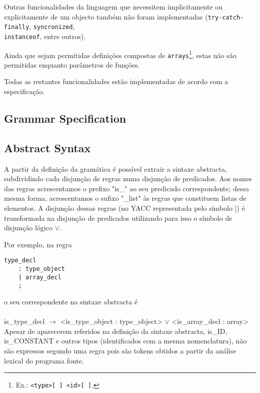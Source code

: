 \documentclass[a4paper]{article}
\begin{document}
Outras funcionalidades da linguagem que necessitem implicitamente ou explicitamente de um objecto também não foram implementadas (\texttt{try-catch-finally}, \texttt{syncronized}, \\ \texttt{instanceof}, entre outros).

Ainda que sejam permitidas definições compostas de \texttt{arrays}\footnote[1]{Ex.: \texttt{<type>[ ] <id>[ ]}.}, estas não são permitidas enquanto parâmetros de funções.

Todas as restantes funcionalidades estão implementadas de acordo com a especificação.

\cleardoublepage

\subsection{Grammar Specification}


\cleardoublepage

\subsection{Abstract Syntax}
\indent \indent A partir da definição da gramática é possível extrair a sintaxe abstracta, subdividindo cada disjunção de regras numa disjunção de predicados.
Aos nomes das regras acrescentamos o prefixo "is\_" ao seu predicado correspondente;
dessa mesma forma, acrescentamos o sufixo "\_list" às regras que constituem listas de elementos.
A disjunção dessas regras (no YACC representada pelo símbolo |) é transformada na disjunção de predicados utilizando para isso
o símbolo de disjunção lógico $\vee$.

\indent Por exemplo, na regra
\begin{verbatim}
type_decl
	: type_object
	| array_decl
	;
\end{verbatim}

o seu correspondente na sintaxe abstracta é \\ \\
is\_type\_decl $\to$ <is\_type\_object : type\_object> $\vee$ <is\_array\_decl : array> \\

\indent \indent Apesar de aparecerem referidos na definição da sintaxe abstracta, is\_ID, \\
is\_CONSTANT e outros tipos (identificados com a mesma nomenclatura),
não são expressos segundo uma regra pois são tokens obtidos a partir da análise lexical do programa fonte.
\end{document}
